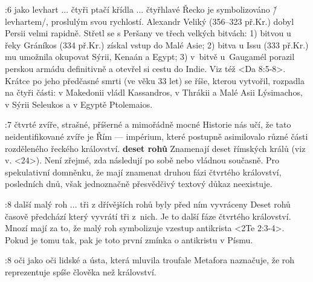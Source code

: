 :6 {jako levhart ... čtyři ptačí křídla ... čtyřhlavé}
     Řecko je symbolizováno \v/levhartem/, proslulým svou rychlostí.
     Alexandr Veliký (356--323 př.Kr.) dobyl Persii velmi rapidně.
     Střetl se s Peršany ve třech velkých bitvách:
     1) bitvou u řeky Gráníkos (334 př.Kr.) získal vstup do Malé Asie; 
     2) bitva u Issu (333 př.Kr.) mu umožnila okupovat Sýrii, Kenaán a Egypt; 
     3) v~bitvě u~Gaugamél porazil perskou armádu definitivně a otevřel si cestu do Indie.
        Viz též <Da 8:5-8>. Krátce po jeho předčasné smrti (ve věku 33 let) se říše, kterou
        vytvořil, rozpadla na čtyři části: v Makedonii vládl Kassandros, v Thrákii a Malé Asii
        Lýsimachos, v Sýrii Seleukos a v Egyptě Ptolemaios.

:7 {čtvrté zvíře, strašné, příšerné a mimořádně mocné}
     Historie nás učí, že tato neidentifikované zvíře je Řím --- impérium, které postupně
     asimilovalo různé části rozděleného řeckého království. 
     {\bf deset rohů} Znamenají deset římských králů (viz v. <24>). Není zřejmé, zda následují po
     sobě nebo vládnou současně. Pro spekulativní domněnku, že mají znamenat druhou fázi čtvrtého
     království,  posledních dnů, však jednoznačně přesvědčivý textový
     důkaz neexistuje. 

:8 {další malý roh ... tři z dřívějších rohů byly před ním vyvráceny}
     Deset rohů časově předchází  který vyvrátí tři z~nich. Je to další fáze
     čtvrtého království. Mnozí mají za to, že malý roh symbolizuje vzestup antikrista 
     <2Te 2:3-4>. Pokud je tomu tak, pak je toto první zmínka o antikristu v Písmu.  

:8 {oči jako oči lidské a ústa, která mluvila troufale}
     Metafora naznačuje, že roh reprezentuje spíše člověka než království. 

\endinput

Komentáře k notaci
------------------

Soubor s poznámkami se bude jmenovat notes-Dan.tex nebo podobně a poznámky
budou ke každé knize ve zvláštním souboru.

Na začátku souboru bude \CommentedBook{zkratka} odkazující na konkrétní
knihu bible, na které se váží poznámky.

Jednotlivá poznámka má syntax:
\Note kapitola:verš {upřesnění} text prázdný řádek.

Pozámka končí prázdným řádkem. Předpokládám, že nebude mít poznámka více
odstavců, když ano, tak se dá použít \endgraf.

